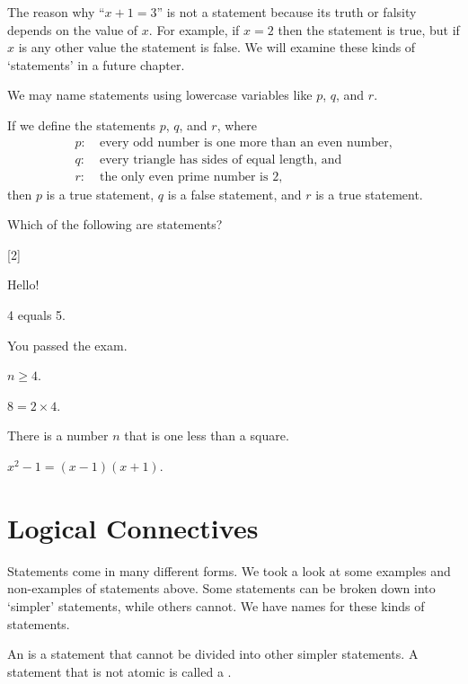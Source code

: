 The reason why ``$x + 1 = 3$'' is not a statement because its truth or falsity depends on the value of $x$. For example, if $x = 2$ then the statement is true, but if $x$ is any other value the statement is false. We will examine these kinds of `statements' in a future chapter.

We may name statements using lowercase variables like $p$, $q$, and $r$.

\begin{example}
    If we define the statements $p$, $q$, and $r$, where
    \begin{align*}
        p: &\ \text{every odd number is one more than an even number},\\
        q: &\ \text{every triangle has sides of equal length}, \text{ and}\\
        r: &\ \text{the only even prime number is 2},
    \end{align*}
    then $p$ is a true statement, $q$ is a false statement, and $r$ is a true statement.
\end{example}

\begin{exercise}
    Which of the following are statements?

    \begin{partquestions}{\alph*}[2]
        \item Hello!
        \item 4 equals 5.
        \item You passed the exam.
        \item $n \geq 4$.
        \item $8 = 2 \times 4$.
        \item There is a number $n$ that is one less than a square.
        \item $x^2 - 1 = (x-1)(x+1)$.
    \end{partquestions}
\end{exercise}

\section{Logical Connectives}
Statements come in many different forms. We took a look at some examples and non-examples of statements above. Some statements can be broken down into `simpler' statements, while others cannot. We have names for these kinds of statements.

\begin{definition}
    An  is a statement that cannot be divided into other simpler statements. A statement that is not atomic is called a .
\end{definition}


